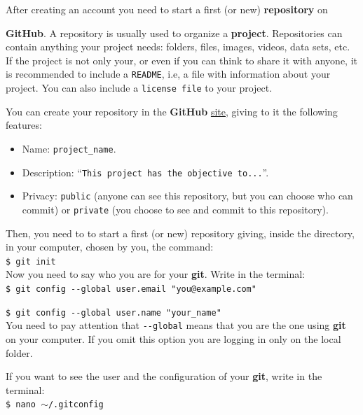 \documentclass[12pt,a4paper,titlepage,brazil]{article}
\begin{document}
After creating an account you need to start a first (or new) {\bf repository} on {{\bf GitHub}. A repository is usually used to organize a {\bf project}. Repositories can contain anything your project needs: folders, files, images, videos, data sets, etc. If the project is not only your, or even if you can think to share it with anyone, it is recommended to include a \texttt{README}, i.e, a file with information about your project. You can also include a \texttt{license file} to your project.

You can create your repository in the {\bf GitHub} \href{https://github.com}{site}, giving to it the following features:
\begin{itemize}
 \item Name: \texttt{project\_name}.
 \item Description: ``\texttt{This project has the objective to...}''.
 \item Privacy: \texttt{public} (anyone can see this repository, but you can choose who can commit) or \texttt{private} (you choose to see and commit to this repository).
\end{itemize}
 
Then, you need to to start a first (or new) repository giving, inside the directory, in your computer, chosen by you, the command:\\

\texttt{\$ git init}\\

Now you need to say who you are for your {\bf git}. Write in the terminal:\\

\texttt{\$ git config -\hspace{0.01cm}-global user.email "you@example.com"}

\texttt{\$ git config -\hspace{0.01cm}-global user.name "your\_name"}\\

You need to pay attention that \texttt{-\hspace{0.01cm}-global} means that you are the one using {\bf git} on your computer. If you omit this option you are logging in only on the local folder.

If you want to see the user and the configuration of your {\bf git}, write in the terminal:\\

\texttt{\$ nano $\sim$/.gitconfig}\\

}
\end{document}
